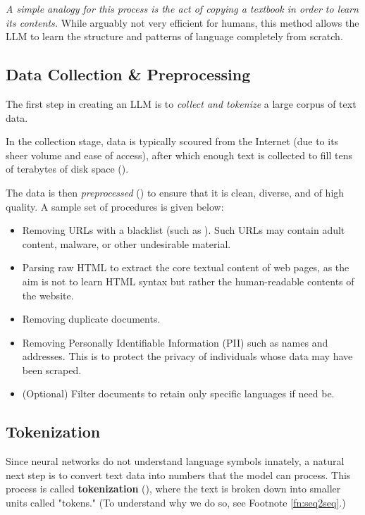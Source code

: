 \documentclass{article} %
\begin{document}
\textit{A simple analogy for this process is the act of copying a textbook in order to learn its contents.}
While arguably not very efficient for humans, this method allows the LLM to learn the structure 
and patterns of language completely from scratch.

\subsection{Data Collection \& Preprocessing}
The first step in creating an LLM is to \textit{collect and tokenize} a large corpus of text data.

In the collection stage, data is typically scoured from the Internet (due to its sheer volume and ease of access),
after which enough text is collected to fill tens of terabytes of disk space (\cite{Karpathy-2025, FineWeb-2024}).

The data is then \textit{preprocessed} (\cite{Karpathy-2025}) to ensure that it is clean, diverse, and of high quality.
A sample set of procedures is given below:
\begin{itemize}
    \item Removing URLs with a blacklist (such as \cite{UT1-2025}).
        Such URLs may contain adult content, malware, or other undesirable material.
    \item Parsing raw HTML to extract the core textual content of web pages,
        as the aim is not to learn HTML syntax but rather the human-readable contents of the website.
    \item Removing duplicate documents.
    \item Removing Personally Identifiable Information (PII) such as names and addresses.
        This is to protect the privacy of individuals whose data may have been scraped.
    \item (Optional) Filter documents to retain only specific languages if need be.
\end{itemize}

\subsection{Tokenization}
Since neural networks do not understand language symbols innately,
a natural next step is to convert text data into numbers that the model can process.
This process is called \textbf{tokenization} (\cite{Karpathy-2025}),
where the text is broken down into smaller units called "tokens." 
(To understand why we do so, see Footnote \ref{fn:seq2seq}.)
\end{document}
